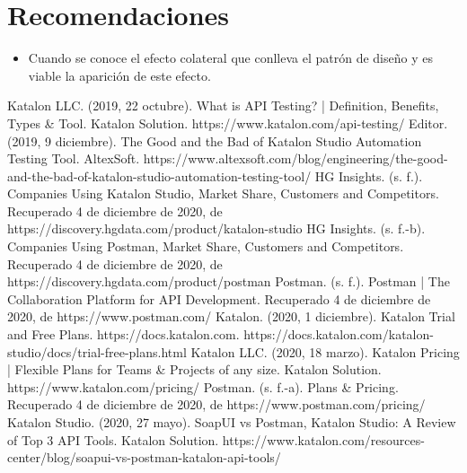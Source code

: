 \documentclass[twoside,twocolumn]{article}
\begin{document}
\section{Recomendaciones}


\begin{itemize}
\item Cuando se conoce el efecto colateral que conlleva el patrón de diseño y es viable la aparición de este efecto.

\end{itemize}




\begin{thebibliography}{99} 

\bibitem[1]{}
\newblock Katalon LLC. (2019, 22 octubre). What is API Testing? | Definition, Benefits, Types \& Tool. Katalon Solution. https://www.katalon.com/api-testing/
\bibitem[2]{}
\newblock Editor. (2019, 9 diciembre). The Good and the Bad of Katalon Studio Automation Testing Tool. AltexSoft. https://www.altexsoft.com/blog/engineering/the-good-and-the-bad-of-katalon-studio-automation-testing-tool/
\bibitem[3]{}
\newblock HG Insights. (s. f.). Companies Using Katalon Studio, Market Share, Customers and Competitors. Recuperado 4 de diciembre de 2020, de https://discovery.hgdata.com/product/katalon-studio
\bibitem[4]{}
\newblock HG Insights. (s. f.-b). Companies Using Postman, Market Share, Customers and Competitors. Recuperado 4 de diciembre de 2020, de https://discovery.hgdata.com/product/postman
\bibitem[5]{}
\newblock Postman. (s. f.). Postman | The Collaboration Platform for API Development. Recuperado 4 de diciembre de 2020, de https://www.postman.com/
\bibitem[6]{}
\newblock Katalon. (2020, 1 diciembre). Katalon Trial and Free Plans. https://docs.katalon.com. https://docs.katalon.com/katalon-studio/docs/trial-free-plans.html
\bibitem[7]{}
\newblock Katalon LLC. (2020, 18 marzo). Katalon Pricing | Flexible Plans for Teams \& Projects of any size. Katalon Solution. https://www.katalon.com/pricing/
\bibitem[8]{}
\newblock Postman. (s. f.-a). Plans \& Pricing. Recuperado 4 de diciembre de 2020, de https://www.postman.com/pricing/
\bibitem[9]{}
\newblock Katalon Studio. (2020, 27 mayo). SoapUI vs Postman, Katalon Studio: A Review of Top 3 API Tools. Katalon Solution. https://www.katalon.com/resources-center/blog/soapui-vs-postman-katalon-api-tools/
\end{thebibliography}

\end{document}
